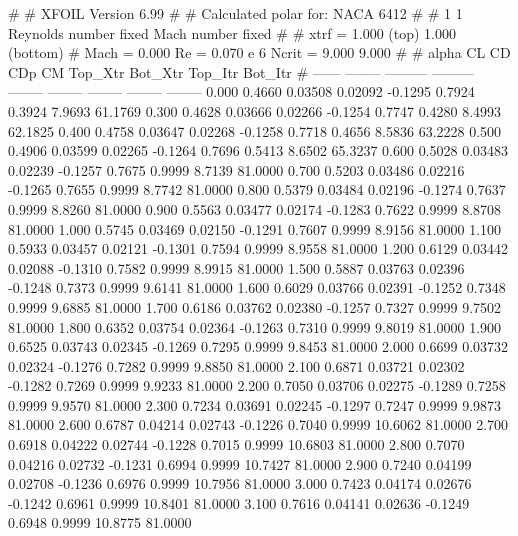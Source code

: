 #  
#       XFOIL         Version 6.99
#  
# Calculated polar for: NACA 6412                                       
#  
# 1 1 Reynolds number fixed          Mach number fixed         
#  
# xtrf =   1.000 (top)        1.000 (bottom)  
# Mach =   0.000     Re =     0.070 e 6     Ncrit =   9.000  9.000
#  
#   alpha    CL        CD       CDp       CM     Top_Xtr  Bot_Xtr  Top_Itr  Bot_Itr
#  ------ -------- --------- --------- -------- -------- -------- -------- --------
   0.000   0.4660   0.03508   0.02092  -0.1295   0.7924   0.3924   7.9693  61.1769
   0.300   0.4628   0.03666   0.02266  -0.1254   0.7747   0.4280   8.4993  62.1825
   0.400   0.4758   0.03647   0.02268  -0.1258   0.7718   0.4656   8.5836  63.2228
   0.500   0.4906   0.03599   0.02265  -0.1264   0.7696   0.5413   8.6502  65.3237
   0.600   0.5028   0.03483   0.02239  -0.1257   0.7675   0.9999   8.7139  81.0000
   0.700   0.5203   0.03486   0.02216  -0.1265   0.7655   0.9999   8.7742  81.0000
   0.800   0.5379   0.03484   0.02196  -0.1274   0.7637   0.9999   8.8260  81.0000
   0.900   0.5563   0.03477   0.02174  -0.1283   0.7622   0.9999   8.8708  81.0000
   1.000   0.5745   0.03469   0.02150  -0.1291   0.7607   0.9999   8.9156  81.0000
   1.100   0.5933   0.03457   0.02121  -0.1301   0.7594   0.9999   8.9558  81.0000
   1.200   0.6129   0.03442   0.02088  -0.1310   0.7582   0.9999   8.9915  81.0000
   1.500   0.5887   0.03763   0.02396  -0.1248   0.7373   0.9999   9.6141  81.0000
   1.600   0.6029   0.03766   0.02391  -0.1252   0.7348   0.9999   9.6885  81.0000
   1.700   0.6186   0.03762   0.02380  -0.1257   0.7327   0.9999   9.7502  81.0000
   1.800   0.6352   0.03754   0.02364  -0.1263   0.7310   0.9999   9.8019  81.0000
   1.900   0.6525   0.03743   0.02345  -0.1269   0.7295   0.9999   9.8453  81.0000
   2.000   0.6699   0.03732   0.02324  -0.1276   0.7282   0.9999   9.8850  81.0000
   2.100   0.6871   0.03721   0.02302  -0.1282   0.7269   0.9999   9.9233  81.0000
   2.200   0.7050   0.03706   0.02275  -0.1289   0.7258   0.9999   9.9570  81.0000
   2.300   0.7234   0.03691   0.02245  -0.1297   0.7247   0.9999   9.9873  81.0000
   2.600   0.6787   0.04214   0.02743  -0.1226   0.7040   0.9999  10.6062  81.0000
   2.700   0.6918   0.04222   0.02744  -0.1228   0.7015   0.9999  10.6803  81.0000
   2.800   0.7070   0.04216   0.02732  -0.1231   0.6994   0.9999  10.7427  81.0000
   2.900   0.7240   0.04199   0.02708  -0.1236   0.6976   0.9999  10.7956  81.0000
   3.000   0.7423   0.04174   0.02676  -0.1242   0.6961   0.9999  10.8401  81.0000
   3.100   0.7616   0.04141   0.02636  -0.1249   0.6948   0.9999  10.8775  81.0000
